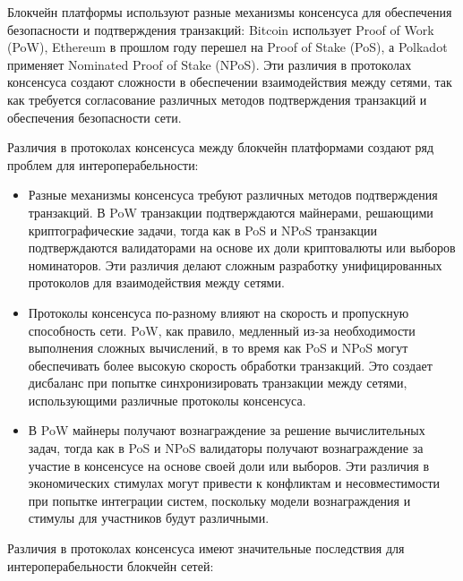 Блокчейн платформы используют разные механизмы консенсуса для обеспечения безопасности и подтверждения транзакций: Bitcoin использует Proof of Work (PoW), Ethereum в прошлом году перешел на Proof of Stake (PoS), а Polkadot применяет Nominated Proof of Stake (NPoS). Эти различия в протоколах консенсуса создают сложности в обеспечении взаимодействия между сетями, так как требуется согласование различных методов подтверждения транзакций и обеспечения безопасности сети.

Различия в протоколах консенсуса между блокчейн платформами создают ряд проблем для интероперабельности:
\begin{itemize}
	\item Разные механизмы консенсуса требуют различных методов подтверждения транзакций. В PoW транзакции подтверждаются майнерами, решающими криптографические задачи, тогда как в PoS и NPoS транзакции подтверждаются валидаторами на основе их доли криптовалюты или выборов номинаторов. Эти различия делают сложным разработку унифицированных протоколов для взаимодействия между сетями.

	\item Протоколы консенсуса по-разному влияют на скорость и пропускную способность сети. PoW, как правило, медленный из-за необходимости выполнения сложных вычислений, в то время как PoS и NPoS могут обеспечивать более высокую скорость обработки транзакций. Это создает дисбаланс при попытке синхронизировать транзакции между сетями, использующими различные протоколы консенсуса.

	\item В PoW майнеры получают вознаграждение за решение вычислительных задач, тогда как в PoS и NPoS валидаторы получают вознаграждение за участие в консенсусе на основе своей доли или выборов. Эти различия в экономических стимулах могут привести к конфликтам и несовместимости при попытке интеграции систем, поскольку модели вознаграждения и стимулы для участников будут различными.
\end{itemize}

Различия в протоколах консенсуса имеют значительные последствия для интероперабельности блокчейн сетей:

